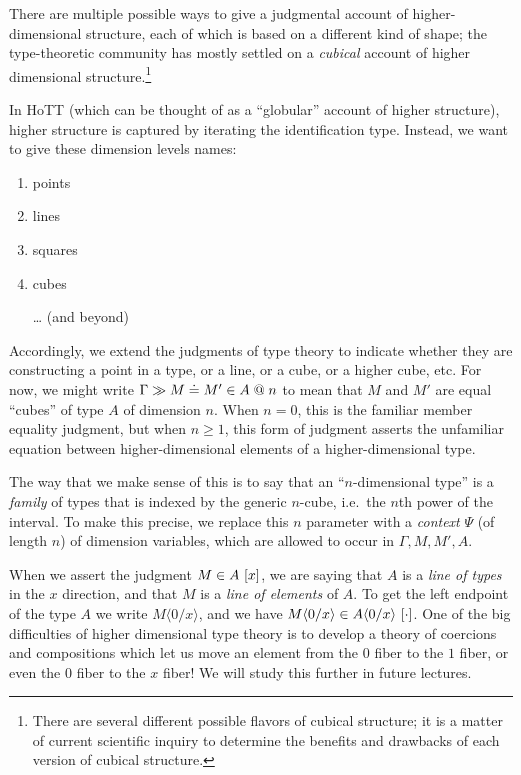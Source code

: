 \documentclass{article}
\newcommand\DimSubst[3]{#3\langle{#1}/{#2}\rangle}
\begin{document}
There are multiple possible ways to give a judgmental account of
higher-dimensional structure, each of which is based on a different
kind of shape; the type-theoretic community has mostly settled on a
\emph{cubical} account of higher dimensional structure.\footnote{There
  are several different possible flavors of cubical structure; it is a
  matter of current scientific inquiry to determine the benefits and
  drawbacks of each version of cubical structure.}

In HoTT (which can be thought of as a ``globular'' account of
higher structure), higher structure is captured by iterating the
identification type. Instead, we want to give these dimension levels
names:

\begin{enumerate}
\item points
\item lines
\item squares
\item cubes
\item[\ldots] (and beyond)
\end{enumerate}

Accordingly, we extend the judgments of type theory to indicate
whether they are constructing a point in a type, or a line, or a cube,
or a higher cube, etc. For now, we might write
$\hasEEC{\Gamma}{M}{M'}{A}\mathrel{@}n$ to mean that $M$ and $M'$ are
equal ``cubes'' of type $A$ of dimension $n$. When $n=0$, this is the
familiar member equality judgment, but when $n\geq 1$, this form of
judgment asserts the unfamiliar equation between higher-dimensional
elements of a higher-dimensional type.

The way that we make sense of this is to say that an ``$n$-dimensional
type'' is a \emph{family} of types that is indexed by the generic
$n$-cube, i.e.\ the $n$th power of the interval. To make this precise,
we replace this $n$ parameter with a \emph{context} $\Psi$ (of length
$n$) of dimension variables, which are allowed to occur in
$\Gamma,M,M',A$.

When we assert the judgment $\hasEC{M}{A}\ [x]$, we are saying that
$A$ is a \emph{line of types} in the $x$ direction, and that $M$ is a
\emph{line of elements} of $A$. To get the left endpoint of the type
$A$ we write $\DimSubst{0}{x}{M}$, and we have
$\hasEC{\DimSubst{0}{x}{M}}{\DimSubst{0}{x}{A}}\ [\cdot]$. One of the
big difficulties of higher dimensional type theory is to develop a
theory of coercions and compositions which let us move an element from
the $0$ fiber to the $1$ fiber, or even the $0$ fiber to the $x$
fiber! We will study this further in future lectures.
\end{document}
